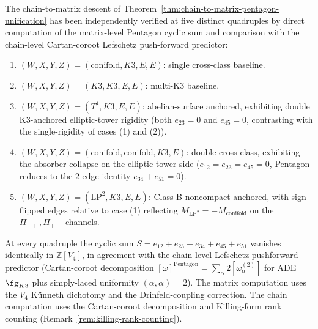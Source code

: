 \begin{remark}
\label{rem:chain-to-matrix-pentagon-five-quadruples}
The chain-to-matrix descent of
Theorem~\ref{thm:chain-to-matrix-pentagon-unification} has been
independently verified at five distinct quadruples by direct
computation of the matrix-level Pentagon cyclic sum and comparison
with the chain-level Cartan-coroot Lefschetz push-forward predictor:
\begin{enumerate}
\item[\textup{(1)}] $(W, X, Y, Z) = (\mathrm{conifold}, K3, E, E)$:
 single cross-class baseline.
\item[\textup{(2)}] $(W, X, Y, Z) = (K3, K3, E, E)$: multi-K$3$
 baseline.
\item[\textup{(3)}] $(W, X, Y, Z) = (T^4, K3, E, E)$: abelian-surface
 anchored, exhibiting double K$3$-anchored elliptic-tower
 rigidity \textup{(}both $e_{23} = 0$ and $e_{45} = 0$,
 contrasting with the single-rigidity of cases \textup{(1)} and
 \textup{(2)}\textup{).}
\item[\textup{(4)}] $(W, X, Y, Z) = (\mathrm{conifold}, \mathrm{conifold},
 K3, E)$: double cross-class, exhibiting the absorber collapse
 on the elliptic-tower side \textup{(}$e_{12} = e_{23} = e_{45} = 0$,
 Pentagon reduces to the $2$-edge identity
 $e_{34} + e_{51} = 0$\textup{).}
\item[\textup{(5)}] $(W, X, Y, Z) = (\mathrm{LP}^2, K3, E, E)$:
 Class-B noncompact anchored, with sign-flipped edges relative
 to case \textup{(1)} reflecting
 $M_{\mathrm{LP}^2} = -M_{\mathrm{conifold}}$ on the
 $\Pi_{++}, \Pi_{+-}$ channels.
\end{enumerate}
At every quadruple the cyclic sum $S = e_{12} + e_{23} + e_{34} + e_{45}
+ e_{51}$ vanishes identically in $\mathbb{Z}[V_4]$, in agreement with the
chain-level Lefschetz pushforward predictor \textup{(}Cartan-coroot
decomposition $[\omega]^{\mathrm{Pentagon}} = \sum_\alpha 2 [\omega^{(2)}_\alpha]$
for ADE $\fg_{K3}$ plus simply-laced uniformity
$(\alpha, \alpha) = 2$\textup{).} The matrix computation uses the
$V_4$ Künneth dichotomy and the Drinfeld-coupling correction.  The
chain computation uses the Cartan-coroot decomposition and
Killing-form rank counting
\textup{(}Remark~\ref{rem:killing-rank-counting}\textup{).}
\end{remark}

